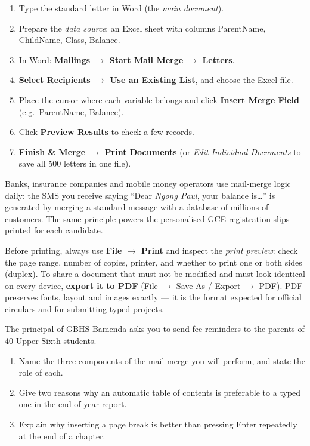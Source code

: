 \documentclass[11pt]{article}
\newcounter{popsec}
\newcounter{popsub}
\newcommand{\courssub}[1]{%
  \stepcounter{popsub}%
  \par\vspace{9pt}\noindent{\popxbold\fontsize{11.5}{13}\selectfont\color{popink}{\color{poporange}\thepopsec.\thepopsub}\hspace{6pt}#1}\par\nopagebreak\vspace{4pt}
}
\begin{document}
\begin{methode}
\begin{enumerate}
\item Type the standard letter in Word (the \emph{main document}).
\item Prepare the \emph{data source}: an Excel sheet with columns ParentName, ChildName, Class, Balance.
\item In Word: \textbf{Mailings $\rightarrow$ Start Mail Merge $\rightarrow$ Letters}.
\item \textbf{Select Recipients $\rightarrow$ Use an Existing List}, and choose the Excel file.
\item Place the cursor where each variable belongs and click \textbf{Insert Merge Field} (e.g.\ \guillemotleft ParentName\guillemotright, \guillemotleft Balance\guillemotright).
\item Click \textbf{Preview Results} to check a few records.
\item \textbf{Finish \& Merge $\rightarrow$ Print Documents} (or \emph{Edit Individual Documents} to save all 500 letters in one file).
\end{enumerate}
\end{methode}

\begin{savaistu}
Banks, insurance companies and mobile money operators use mail-merge logic daily: the SMS you receive saying ``Dear \emph{Ngong Paul}, your balance is\ldots'' is generated by merging a standard message with a database of millions of customers. The same principle powers the personalised GCE registration slips printed for each candidate.
\end{savaistu}

\courssub{Printing and Exporting to PDF}

Before printing, always use \textbf{File $\rightarrow$ Print} and inspect the \emph{print preview}: check the page range, number of copies, printer, and whether to print one or both sides (duplex). To share a document that must not be modified and must look identical on every device, \textbf{export it to PDF} (File $\rightarrow$ Save As / Export $\rightarrow$ PDF). PDF preserves fonts, layout and images exactly — it is the format expected for official circulars and for submitting typed projects.

\begin{exercice}
The principal of GBHS Bamenda asks you to send fee reminders to the parents of 40 Upper Sixth students.
\begin{enumerate}
\item Name the three components of the mail merge you will perform, and state the role of each.
\item Give two reasons why an automatic table of contents is preferable to a typed one in the end-of-year report.
\item Explain why inserting a page break is better than pressing Enter repeatedly at the end of a chapter.
\end{enumerate}
\end{exercice}
\end{document}
